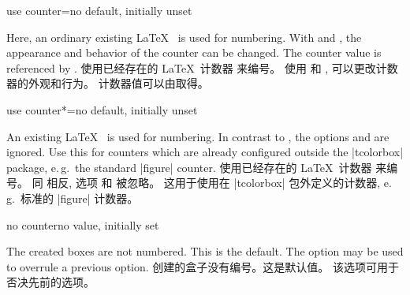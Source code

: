 \begin{newTcbKey}{use counter}{=}{no default, initially unset}
\begin{stripedbox}
Here, an ordinary existing \LaTeX\  is used for numbering.
With  and , 
the appearance and behavior of the counter can be changed. 
The counter value is referenced by .
\tcblower
使用已经存在的 \LaTeX\ 计数器  来编号。%
使用  和 , %
可以更改计数器的外观和行为。%
计数器值可以由取得。
\end{stripedbox}    


\end{newTcbKey}


\begin{newTcbKey}[][doc new=2014-09-19]{use counter*}{=}{no default, initially unset}
\begin{stripedbox}
An existing \LaTeX\  is used for numbering. 
In contrast to , the options  and
 are ignored. 
Use this for counters which are already configured outside the |tcolorbox| package, e.\,g.\ the standard |figure| counter.
\tcblower
使用已经存在的 \LaTeX\ 计数器  来编号。%
同  相反, 选项  和  被忽略。%
这用于使用在 |tcolorbox| 包外定义的计数器, e.\,g.\ 标准的 |figure| 计数器。
\end{stripedbox}
\end{newTcbKey}

\begin{newTcbKey}{no counter}{}{no value, initially set}
\begin{stripedbox}
The created boxes are not numbered. This is the default. 
The option may be used to overrule a previous option.
\tcblower
创建的盒子没有编号。这是默认值。%
该选项可用于否决先前的选项。
\end{stripedbox}
\end{newTcbKey}

